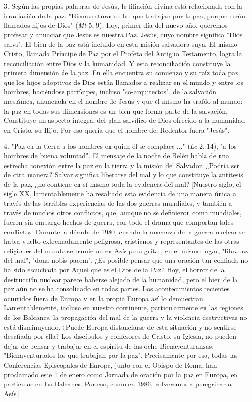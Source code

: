 \begin{body}
3. Según las propias palabras de Jesús, la filiación divina está
relacionada con la irradiación de la paz. "Bienaventurados los que
trabajan por la paz, porque serán llamados hijos de Dios" (\emph{Mt} 5,
9). Hoy, primer día del nuevo año, queremos profesar y anunciar que
Jesús es nuestra Paz. Jesús, cuyo nombre significa "Dios salva". El bien
de la paz está incluido en esta misión salvadora suya. El mismo Cristo,
llamado Príncipe de Paz por el Profeta del Antiguo Testamento, logra la
reconciliación entre Dios y la humanidad. Y esta reconciliación
constituye la primera dimensión de la paz. En ella encuentra su comienzo
y su raíz toda paz que los hijos adoptivos de Dios están llamados a
realizar en el mundo y entre los hombres, haciéndose partícipes, incluso
"co-arquitectos", de la salvación mesiánica, anunciada en el nombre de
Jesús y que él mismo ha traído al mundo: la paz en todas sus dimensiones
es un bien que forma parte de la salvación. Constituye un aspecto
integral del plan salvífico de Dios ofrecido a la humanidad en Cristo,
su Hijo. Por eso quería que el nombre del Redentor fuera "Jesús".

4. "Paz en la tierra a los hombres en quien él se complace ..."
(\emph{Lc} 2, 14), "a los hombres de buena voluntad". El mensaje de la
noche de Belén habla de una estrecha conexión entre la paz en la tierra
y la misión del Salvador. ¿Podría ser de otra manera? Salvar significa
liberarse del mal y lo que constituye la antítesis de la paz, ¿no
contiene en sí mismo toda la evidencia del mal? {[}Nuestro siglo, el
siglo XX, lamentablemente ha resaltado esta evidencia de una manera
única a través de las terribles experiencias de las dos guerras
mundiales, y también a través de muchos otros conflictos, que, aunque no
se definieron como mundiales, fueron sin embargo hechos de guerra, con
todo el drama que comportan tales conflictos. Durante la década de 1980,
cuando la amenaza de la guerra nuclear se había vuelto extremadamente
peligrosa, cristianos y representantes de las otras religiones del mundo
se reunieron en Asís para gritar, en el mismo lugar, "líbranos del mal",
"dona nobis pacem". ¿Es posible pensar que una oración tan confiada no
ha sido escuchada por Aquel que es el Dios de la Paz? Hoy, el horror de
la destrucción nuclear parece haberse alejado de la humanidad, pero el
bien de la paz aún no se ha consolidado en todas partes. Los
acontecimientos recientes ocurridos fuera de Europa y en la propia
Europa así lo demuestran. Lamentablemente, incluso en nuestro
continente, particularmente en las regiones de los Balcanes, la
propagación del mal de la guerra y la violencia destructivas no está
disminuyendo. ¿Puede Europa distanciarse de esta situación y no sentirse
desafiada por ella? Los discípulos y confesores de Cristo, su Iglesia,
no pueden dejar de pensar y trabajar en el espíritu de las ocho
Bienaventuranzas: "Bienaventurados los que trabajan por la paz".
Precisamente por eso, todas las Conferencias Episcopales de Europa,
junto con el Obispo de Roma, han proclamado este 1 de enero como Jornada
de oración por la paz en Europa, en particular en los Balcanes. Por eso,
como en 1986, volveremos a peregrinar a Asís.{]}


\end{body}

